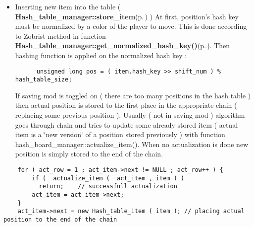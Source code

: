 \begin{itemize}
\item Inserting new item into the table ( {\bf Hash\_\-table\_\-manager::store\_\-item}{\rm (p.\,\pageref{classHash__table__manager_a5})} ) At first, position's hash key must be normalized by a color of the player to move. This is done according to Zobrist method in function {\bf Hash\_\-table\_\-manager::get\_\-normalized\_\-hash\_\-key()}{\rm (p.\,\pageref{classHash__table__manager_a4})}. Then hashing function is applied on the normalized hash key : 

\footnotesize\begin{verbatim}      unsigned long pos = ( item.hash_key >> shift_num ) % hash_table_size;
\end{verbatim}
\normalsize
 If saving mod is toggled on ( there are too many positions in the hash table ) then actual position is stored to the first place in the appropriate chain ( replacing some previous position ). Usually ( not in saving mod ) algorithm goes through chain and tries to update some already stored item ( actual item is a \char`\"{}new version\char`\"{} of a position stored previously ) with function hash\_\-board\_\-manager::actualize\_\-item(). When no actualization is done new position is simply stored to the end of the chain.\end{itemize}




\footnotesize\begin{verbatim}    for ( act_row = 1 ; act_item->next != NULL ; act_row++ ) {
        if (  actualize_item (  act_item , item ) ) 
          return;    // successfull actualization
        act_item = act_item->next;
    }
    act_item->next = new Hash_table_item ( item ); // placing actual position to the end of the chain 
\end{verbatim}
\normalsize


